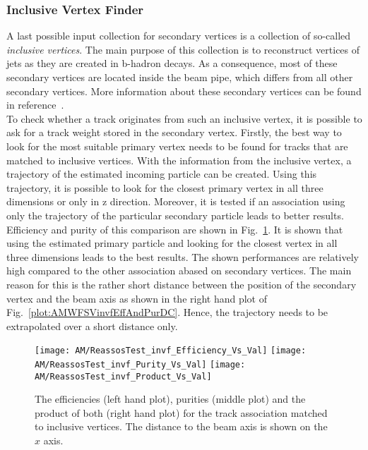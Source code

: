 \subsubsection{Inclusive Vertex Finder \label{sec:AMWFSVivf}}

A last possible input collection for secondary vertices is a collection of so-called \textit{inclusive vertices}. The main purpose of this collection is to reconstruct vertices of jets as they are created in b-hadron decays. As a consequence, most of these secondary vertices are located inside the beam pipe, which differs from all other secondary vertices. More information about these secondary vertices can be found in reference~. \\
To check whether a track originates from such an inclusive vertex, it is possible to ask for a track weight stored in the secondary vertex. Firstly, the best way to look for the most suitable primary vertex needs to be found for tracks that are matched to inclusive vertices. With the information from the inclusive vertex, a trajectory of the estimated incoming particle can be created. Using this trajectory, it is possible to look for the closest primary vertex in all three dimensions or only in z direction. Moreover, it is tested if an association using only the trajectory of the particular secondary particle leads to better results. Efficiency and purity of this comparison are shown in Fig.~\ref{plot:AMWFSVinvfEffAndPurSO}. It is shown that using the estimated primary particle and looking for the closest vertex in all three dimensions leads to the best results. The shown performances are relatively high compared to the other association abased on secondary vertices. The main reason for this is the rather short distance between the position of the secondary vertex and the beam axis as shown in the right hand plot of Fig.~\ref{plot:AMWFSVinvfEffAndPurDC}. Hence, the trajectory needs to be extrapolated over a short distance only.

\begin{figure}[Ht]
    \centering
    \texttt{[image: AM/ReassosTest\_invf\_Efficiency\_Vs\_Val]}
    \texttt{[image: AM/ReassosTest\_invf\_Purity\_Vs\_Val]}
    \texttt{[image: AM/ReassosTest\_invf\_Product\_Vs\_Val]}
    \caption[Efficiencies, purities and their product of the association using inclusive vertices for different search options as a function of distance to the beam axis]{The efficiencies (left hand plot), purities (middle plot) and the product of both (right hand plot) for the track association matched to inclusive vertices. The distance to the beam axis is shown on the $x$ axis.\label{plot:AMWFSVinvfEffAndPurSO}}
\end{figure}

